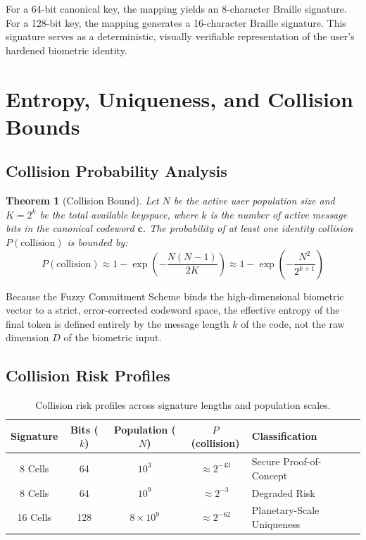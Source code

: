 \documentclass[11pt,twoside]{amsart}
\theoremstyle{plain}
\newtheorem{theorem}{Theorem}[section]
\theoremstyle{definition}
\theoremstyle{remark}
\newcommand{\bc}{\mathbf{c}}
\begin{document}
For a 64-bit canonical key, the mapping yields an 8-character Braille signature. For a 128-bit key, the mapping generates a 16-character Braille signature. This signature serves as a deterministic, visually verifiable representation of the user's hardened biometric identity.

\section{Entropy, Uniqueness, and Collision Bounds}

\subsection{Collision Probability Analysis}

\begin{theorem}[Collision Bound]
\label{thm:collision}
Let $N$ be the active user population size and $K = 2^k$ be the total available keyspace, where $k$ is the number of active message bits in the canonical codeword $\bc$. The probability of at least one identity collision $P(\text{collision})$ is bounded by:
\begin{equation}
P(\text{collision}) \approx 1 - \exp\left(-\frac{N(N-1)}{2K}\right) \approx 1 - \exp\left(-\frac{N^2}{2^{k+1}}\right)
\end{equation}
\end{theorem}

Because the Fuzzy Commitment Scheme binds the high-dimensional biometric vector to a strict, error-corrected codeword space, the effective entropy of the final token is defined entirely by the message length $k$ of the code, not the raw dimension $D$ of the biometric input.

\subsection{Collision Risk Profiles}

\begin{table}[htbp]
\centering
\caption{Collision risk profiles across signature lengths and population scales.}
\label{tab:collision}
\begin{tabular}{@{}ccccp{3.5cm}@{}}
\toprule
\textbf{Signature} & \textbf{Bits ($k$)} & \textbf{Population ($N$)} & \textbf{$P$(collision)} & \textbf{Classification} \\
\midrule
8 Cells & 64 & $10^3$ & $\approx 2^{-43}$ & Secure Proof-of-Concept \\
8 Cells & 64 & $10^9$ & $\approx 2^{-3}$ & Degraded Risk \\
16 Cells & 128 & $8 \times 10^9$ & $\approx 2^{-62}$ & Planetary-Scale Uniqueness \\
\bottomrule
\end{tabular}
\end{table}
\end{document}
